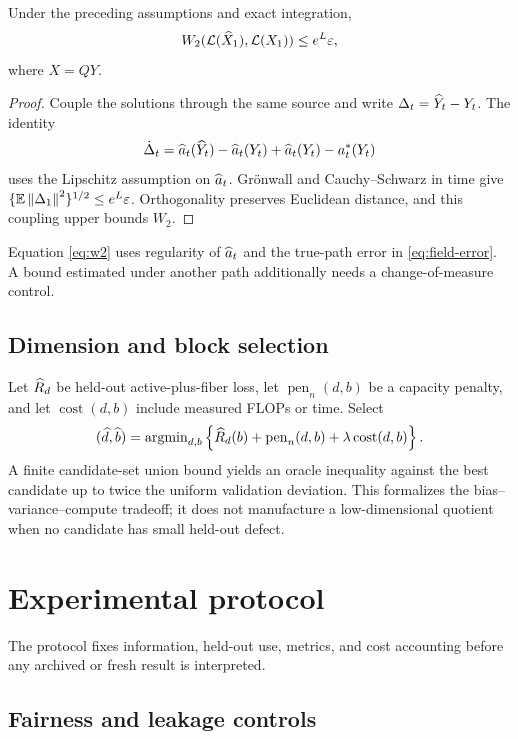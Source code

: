 \begin{proposition}
Under the preceding assumptions and exact integration,
\begin{equation}
 W_2(\mathcal L(\widehat X_1),\mathcal L(X_1))
 \le e^L\varepsilon,
 \label{eq:w2}
\end{equation}
where $X=QY$.
\end{proposition}
\begin{proof}
Couple the solutions through the same source and write $\Delta_t=\widehat Y_t-Y_t$.  The identity
\[
 \dot\Delta_t=\widehat a_t(\widehat Y_t)-\widehat a_t(Y_t)+\widehat a_t(Y_t)-a_t^*(Y_t)
\]
uses the Lipschitz assumption on $\widehat a_t$.  Gr\"onwall and Cauchy--Schwarz in time give $\{\mathbb E\left\lVert \Delta_1\right\rVert^2\}^{1/2}\le e^L\varepsilon$.  Orthogonality preserves Euclidean distance, and this coupling upper bounds $W_2$.
\end{proof}
Equation \eqref{eq:w2} uses regularity of $\widehat a_t$ and the true-path error in \eqref{eq:field-error}.  A bound estimated under another path additionally needs a change-of-measure control.

\subsection{Dimension and block selection}

Let $\widehat R_d$ be held-out active-plus-fiber loss, let $\operatorname{pen}_n(d,b)$ be a capacity penalty, and let $\operatorname{cost}(d,b)$ include measured FLOPs or time.  Select
\begin{equation}
 (\widehat d,\widehat b)=\operatorname{argmin}_{d,b}
 \left\{\widehat R_d(b)+\operatorname{pen}_n(d,b)+\lambda\operatorname{cost}(d,b)\right\}.
 \label{eq:model-select}
\end{equation}
A finite candidate-set union bound yields an oracle inequality against the best candidate up to twice the uniform validation deviation.  This formalizes the bias--variance--compute tradeoff; it does not manufacture a low-dimensional quotient when no candidate has small held-out defect.

\section{Experimental protocol}

The protocol fixes information, held-out use, metrics, and cost accounting before any archived or fresh result is interpreted.

\subsection{Fairness and leakage controls}

